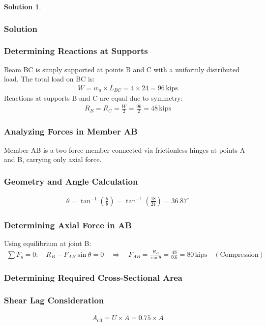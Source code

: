 \documentclass[12pt]{article}
\theoremstyle{definition} %
\newtheorem{solution}{Solution}
\theoremstyle{plain} %
\begin{document}
\begin{solution}
\begin{enumerate}
\subsubsection*{Solution}

\subsubsection*{Determining Reactions at Supports}
Beam BC is simply supported at points B and C with a uniformly distributed load. The total load on BC is:
\begin{align}
W = w_u \times L_{BC} = 4 \times 24 = 96 \, \text{kips}
\end{align}
Reactions at supports B and C are equal due to symmetry:
\begin{align}
R_B = R_C = \frac{W}{2} = \frac{96}{2} = 48 \, \text{kips}
\end{align}

\subsubsection*{Analyzing Forces in Member AB}
Member AB is a two-force member connected via frictionless hinges at points A and B, carrying only axial force.

\subsubsection*{Geometry and Angle Calculation}
\begin{align}
\theta = \tan^{-1}\left( \frac{h}{b} \right) = \tan^{-1}\left( \frac{18}{24} \right) = 36.87^\circ
\end{align}

\subsubsection*{Determining Axial Force in AB}
Using equilibrium at joint B:
\begin{align}
\sum F_y = 0: \quad R_B - F_{AB} \sin{\theta} = 0 \quad \Rightarrow \quad F_{AB} = \frac{R_B}{\sin{\theta}} = \frac{48}{0.6} = 80 \, \text{kips} \quad (\text{Compression})
\end{align}

\subsubsection*{Determining Required Cross-Sectional Area}

\subsubsection*{Shear Lag Consideration}
\begin{align}
A_{\text{eff}} = U \times A = 0.75 \times A
\end{align}


\end{enumerate}
\end{solution}
\end{document}
